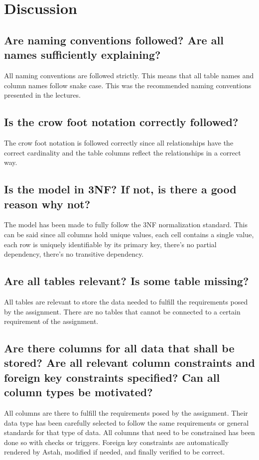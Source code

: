\documentclass[a4paper]{scrartcl}
\begin{document}
\section{Discussion}

\subsection{Are naming conventions followed? Are all names sufficiently explaining?}
All naming conventions are followed strictly. This means that all table names and column names follow snake case. This was the recommended naming conventions presented in the lectures.

\subsection{Is the crow foot notation correctly followed?}
The crow foot notation is followed correctly since all relationships have the correct cardinality and the table columns reflect the relationships in a correct way.

\subsection{Is the model in 3NF? If not, is there a good reason why not?}
The model has been made to fully follow the 3NF normalization standard. This can be said since all columns hold unique values, each cell contains a single value, each row is uniquely identifiable by its primary key, there's no partial dependency, there's no transitive dependency.

\subsection{Are all tables relevant? Is some table missing?}
All tables are relevant to store the data needed to fulfill the requirements posed by the assignment. There are no tables that cannot be connected to a certain requirement of the assignment.


\subsection{Are there columns for all data that shall be stored? Are all relevant column constraints and foreign key constraints specified? Can all column types be motivated?}
All columns are there to fulfill the requirements posed by the assignment. Their data type has been carefully selected to follow the same requirements or general standards for that type of data. All columns that need to be constrained has been done so with checks or triggers. Foreign key constraints are automatically rendered by Astah, modified if needed, and finally verified to be correct.
\end{document}
